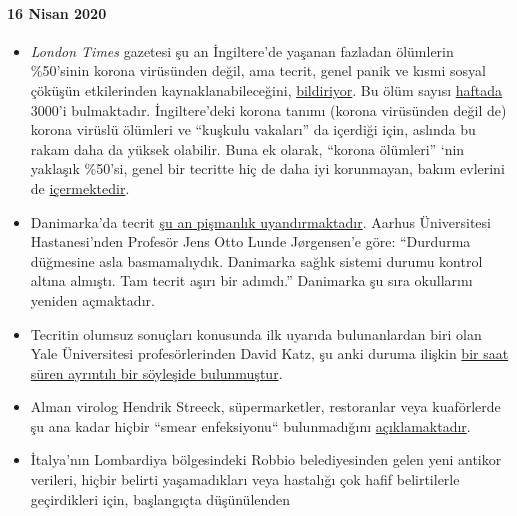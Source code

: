 \hypertarget{16-nisan-2020}{%
\paragraph{16 Nisan 2020}\label{16-nisan-2020}}

\begin{itemize}
\tightlist
\item
  \emph{London Times} gazetesi şu an İngiltere'de yaşanan fazladan
  ölümlerin \%50'sinin korona virüsünden değil, ama tecrit, genel panik
  ve kısmi sosyal çöküşün etkilerinden kaynaklanabileceğini,
  \href{https://archive.is/2eKCW}{bildiriyor}. Bu ölüm sayısı
  \href{https://www.ons.gov.uk/peoplepopulationandcommunity/birthsdeathsandmarriages/deaths/bulletins/deathsregisteredweeklyinenglandandwalesprovisional/weekending3april2020}{haftada}
  3000'i bulmaktadır. İngiltere'deki korona tanımı (korona virüsünden
  değil de) korona virüslü ölümleri ve ``kuşkulu vakaları'' da içerdiği
  için, aslında bu rakam daha da yüksek olabilir. Buna ek olarak,
  ``korona ölümleri'' `nin yaklaşık \%50'si, genel bir tecritte hiç de
  daha iyi korunmayan, bakım evlerini de
  \href{https://ltccovid.org/2020/04/12/mortality-associated-with-covid-19-outbreaks-in-care-homes-early-international-evidence/}{içermektedir}.
\item
  Danimarka'da tecrit
  \href{https://jyllands-posten.dk/debat/breve/ECE12074246/vi-skulle-aldrig-have-trykket-paa-stopknappen/}{şu
  an pişmanlık uyandırmaktadır}. Aarhus Üniversitesi Hastanesi'nden
  Profesör Jens Otto Lunde Jørgensen'e göre: ``Durdurma düğmesine asla
  basmamalıydık. Danimarka sağlık sistemi durumu kontrol altına almıştı.
  Tam tecrit aşırı bir adımdı.'' Danimarka şu sıra okullarını yeniden
  açmaktadır.
\item
  Tecritin olumsuz sonuçları konusunda ilk uyarıda bulunanlardan biri
  olan Yale Üniversitesi profesörlerinden David Katz, şu anki duruma
  ilişkin \href{https://www.youtube.com/watch?v=VK0Wtjh3HVA}{bir saat
  süren ayrıntılı bir söyleşide bulunmuştur}.
\item
  Alman virolog Hendrik Streeck, süpermarketler, restoranlar veya
  kuaförlerde şu ana kadar hiçbir ``smear enfeksiyonu`` bulunmadığını
  \href{https://today.rtl.lu/news/science-and-environment/a/1498185.html}{açıklamaktadır}.
\item
  İtalya'nın Lombardiya bölgesindeki Robbio belediyesinden gelen yeni
  antikor verileri, hiçbir belirti yaşamadıkları veya hastalığı çok
  hafif belirtilerle geçirdikleri için, başlangıçta düşünülenden

\end{itemize}
